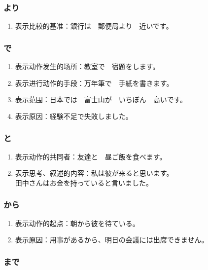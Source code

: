\subsubsection{より}%

\begin{enumerate}
  \item 表示比较的基准：銀行は　郵便局より　近いです。
\end{enumerate}


\subsubsection{で}%

\begin{enumerate}
  \item 表示动作发生的场所：教室で　宿題をします。
  \item 表示进行动作的手段：万年筆で　手紙を書きます。
  \item 表示范围：日本では　富士山が　いちぼん　高いです。
  \item 表示原因：経験不足で失敗しました。
\end{enumerate}


\subsubsection{と}%

\begin{enumerate}
  \item 表示动作的共同者：友達と　昼ご飯を食べます。
  \item 表示思考、叙述的内容：私は彼が来ると思います。\\
    田中さんはお金を持っていると言いました。
\end{enumerate}


\subsubsection{から}%

\begin{enumerate}
  \item 表示动作的起点：朝から彼を待ている。
  \item 表示原因：用事があるから、明日の会議には出席できません。
\end{enumerate}


\subsubsection{まで}%

